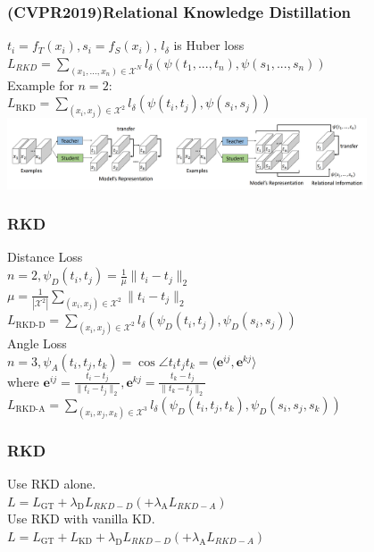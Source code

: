 \documentclass{beamer}
\begin{document}
\begin{frame}
\frametitle{(CVPR2019)Relational Knowledge Distillation}
$t_i=f_T(x_i), s_i=f_S(x_i)$, $l_\delta$ is Huber loss
$L_{RKD}=\sum\limits_{(x_1,...,x_n)\in\mathcal X^N}{l_\delta(\psi(t_1,...,t_n),\psi(s_1,...,s_n))}$ \\
\vspace{5mm} %
Example for $n=2$:\\
$L_{\textrm{RKD}}=\sum\limits_{(x_i,x_j)\in\mathcal X^2}{l_\delta(\psi(t_i,t_j),\psi(s_i,s_j))}$
\includegraphics[width=0.8\textwidth]{rkd.png} \\
\end{frame}

\begin{frame}
\frametitle{RKD}
Distance Loss \\ $n=2,\psi_D(t_i,t_j)=\frac{1}{\mu}\|t_i-t_j\|_2$ \\
$\mu=\frac{1}{|\mathcal X^2|}\sum\limits_{(x_i,x_j)\in \mathcal X^2}\|t_i-t_j\|_2$\\
$L_{\textrm{RKD-D}}=\sum\limits_{(x_i,x_j)\in\mathcal X^2}{l_\delta(\psi_D(t_i,t_j),\psi_D(s_i,s_j))}$ \\
\vspace{5mm} %
Angle Loss \\ $n=3,\psi_A(t_i,t_j, t_k)=\cos\angle{t_it_jt_k}=\langle\bm e^{ij}, \bm e^{kj}\rangle$\\
where $\bm e^{ij}=\frac{t_i-t_j}{\|t_i-t_j\|_2},\bm e^{kj}=\frac{t_k-t_j}{\|t_k-t_j\|_2}$
$L_{\textrm{RKD-A}}=\sum\limits_{(x_i,x_j, x_k)\in\mathcal X^3}{l_\delta(\psi_D(t_i,t_j, t_k),\psi_D(s_i, s_j, s_k))}$
\end{frame}

\begin{frame}
\frametitle{RKD}
Use RKD alone. \\
$L=L_{\textrm{GT}}+\lambda_{\textrm{D}}L_{RKD-D}(+\lambda_{\textrm{A}}L_{RKD-A})$\\
Use RKD with vanilla KD. \\
$L=L_{\textrm{GT}}+L_{\textrm{KD}}+\lambda_{\textrm{D}}L_{RKD-D}(+\lambda_{\textrm{A}}L_{RKD-A})$
\end{frame}
\end{document}

